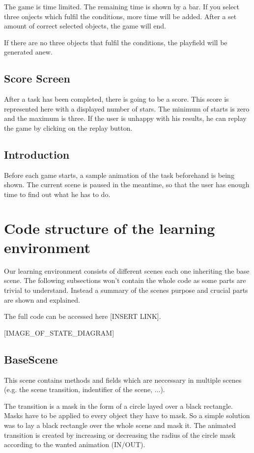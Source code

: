 The game is time limited. The remaining time is shown by a bar.
If you select three onjects which fulfil the conditions, more time will be added.
After a set amount of correct selected objects, the game will end.

If there are no three objects that fulfil the conditions, the playfield will be generated anew.

\subsection{Score Screen}\label{subsec:score-screen}
After a task has been completed, there is going to be a score.
This score is represented here with a displayed number of stars.
The minimum of starts is zero and the maximum is three.
If the user is unhappy with his results, he can replay the game by clicking on the replay button.

\subsection{Introduction}\label{subsec:introduction}
Before each game starts, a sample animation of the task beforehand is being shown.
The current scene is paused in the meantime, so that the user has enough time to find out what he has to do.

\section{Code structure of the learning environment}\label{sec:code-structure-of-the-learning-environment}
Our learning environment consists of different scenes each one inheriting the base scene.
The following subsections won't contain the whole code as some parts are trivial to understand.
Instead a summary of the scenes purpose and crucial parts are shown and explained.

The full code can be accessed here [INSERT LINK].

[IMAGE_OF_STATE_DIAGRAM]

\subsection{BaseScene}\label{subsec:basescene}
This scene contains methods and fields which are neccessary in multiple scenes
(e.g. the scene transition, indentifier of the scene, ...).

The transition is a mask in the form of a circle layed over a black rectangle.
Masks have to be applied to every object they have to mask.
So a simple solution was to lay a black rectangle over the whole scene and mask it.
The animated transition is created by increasing or decreasing the radius of the circle
mask according to the wanted animation (IN/OUT).

